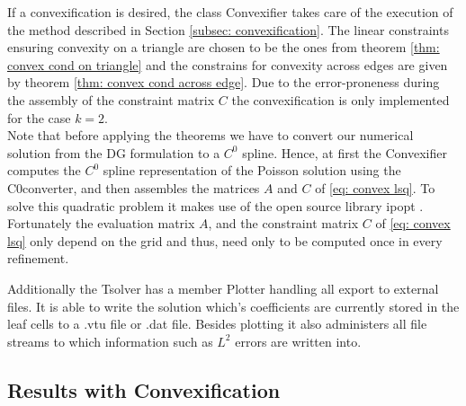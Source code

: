 If a convexification is desired, the class Convexifier takes care of the execution of the method described in Section \ref{subsec: convexification}. The linear constraints ensuring convexity on a triangle are chosen to be the ones from theorem \ref{thm: convex cond on triangle} and the constrains for convexity across edges are given by theorem \ref{thm: convex cond across edge}. Due to the error-proneness during the assembly of the constraint matrix $C$ the convexification is only implemented for the case $k=2$. \\
Note that before applying the theorems we have to convert our numerical solution from the DG formulation to a $C^0$ spline.
Hence, at first the Convexifier computes the $C^0$ spline representation of the Poisson solution using the C0converter, and then assembles the matrices $A$ and $C$ of \eqref{eq: convex lsq}. To solve this quadratic problem it makes use of the open source library ipopt \cite{ipopt}.\\
Fortunately the evaluation matrix $A$, and the constraint matrix $C$ of \eqref{eq: convex lsq} only depend on the grid and thus, need only to be computed once in every refinement.

Additionally the Tsolver has a member Plotter handling all export to external files. It is able to write the solution which's coefficients are currently stored in the leaf cells to a .vtu file or .dat file. Besides plotting it also administers all file streams to which information such as $L^2$ errors are written into.

\subsection{Results with Convexification}

